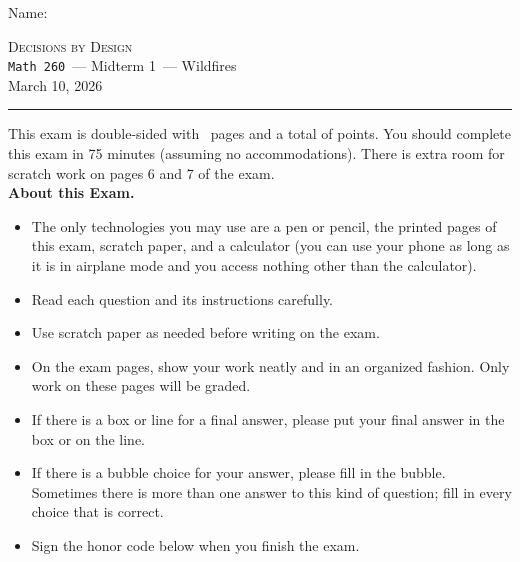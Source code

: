 \documentclass[12pt,addpoints]{exam}
\newcommand{\coursename}{Decisions by Design}
\newcommand{\coursenumber}{{\tt Math 260}}
\newcommand{\examname}{Midterm 1}
\newcommand{\examdate}{March 10, 2026}
\begin{document}
\thispagestyle{empty}
\noindent Name: \hrulefill\\[1em]


\bigskip

\noindent\hrulefill
\bigskip
\begin{center}
\large \textsc{\coursename} \\
\smallskip
\normalsize \coursenumber\ --- \examname\ --- Wildfires\\
\smallskip
\examdate
\end{center}
\bigskip
\hrule


\vspace{20pt}

\noindent This exam is double-sided with \numpages\ pages and a total of  points. You should complete this exam in 75 minutes (assuming no accommodations). There is extra room for scratch work on pages 6 and 7 of the exam.\\


\noindent \textbf{About this Exam.}
\begin{itemize}
  \setlength{\itemindent}{-1em}
  \item The only technologies you may use are a pen or pencil, the printed pages of this exam, scratch paper, and a calculator (you can use your phone as long as it is in airplane mode and you access nothing other than the calculator).
	\item Read each question and its instructions carefully.
	\item Use scratch paper as needed before writing on the exam.
	\item On the exam pages, show your work neatly and in an organized fashion. Only work on these pages will be graded.
	\item If there is a box or line for a final answer, please put your final answer in the box or on the line.
	\item If there is a bubble choice for your answer, please fill in the bubble. Sometimes there is more than one answer to this kind of question; fill in every choice that is correct.
  \item Sign the honor code below when you finish the exam.
\end{itemize} 
\end{document}

